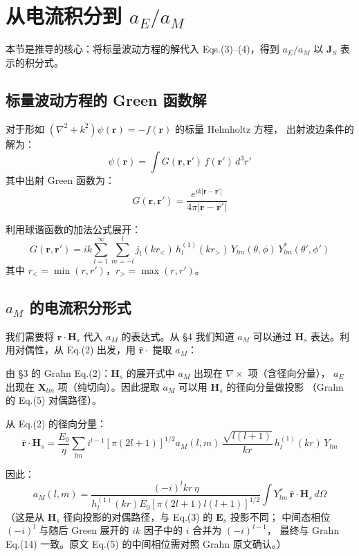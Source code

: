 \section{从电流积分到 $a_E/a_M$}

本节是推导的核心：将标量波动方程的解代入 Eqs.(3)--(4)，得到 $a_E/a_M$ 以 $\mathbf{J}_S$ 表示的积分式。

\subsection{标量波动方程的 Green 函数解}

对于形如 $(\nabla^2 + k^2)\psi(\mathbf{r}) = -f(\mathbf{r})$ 的标量 Helmholtz 方程，
出射波边条件的解为：
$$
\psi(\mathbf{r}) = \int G(\mathbf{r},\mathbf{r}')\,f(\mathbf{r}')\,d^3r'
$$
其中出射 Green 函数为：
$$
G(\mathbf{r},\mathbf{r}') = \frac{e^{ik|\mathbf{r}-\mathbf{r}'|}}{4\pi|\mathbf{r}-\mathbf{r}'|}
$$

利用球谐函数的加法公式展开：
$$
G(\mathbf{r},\mathbf{r}') = ik\sum_{l=1}^\infty\sum_{m=-l}^l j_l(kr_<)\,h_l^{(1)}(kr_>)\,
  Y_{lm}(\theta,\phi)\,Y_{lm}^*(\theta',\phi')
$$
其中 $r_< = \min(r,r')$，$r_> = \max(r,r')$。

\subsection{$a_M$ 的电流积分形式}

我们需要将 $\mathbf{r}\cdot\mathbf{H}_s$ 代入 $a_M$ 的表达式。从 \S4 我们知道 $a_M$ 可以通过
$\mathbf{H}_s$ 表达。利用对偶性，从 Eq.(2) 出发，用 $\hat{\mathbf{r}}\cdot$ 提取 $a_M$：

由 §3 的 Grahn Eq.(2)：$\mathbf{H}_s$ 的展开式中 $a_M$ 出现在 $\nabla\times$ 项（含径向分量），
$a_E$ 出现在 $\mathbf{X}_{lm}$ 项（纯切向）。因此提取 $a_M$ 可以用 $\mathbf{H}_s$ 的径向分量做投影
（Grahn 的 Eq.(5) 对偶路径）。

从 Eq.(2) 的径向分量：
$$
\hat{\mathbf{r}}\cdot\mathbf{H}_s = \frac{E_0}{\eta}\sum_{lm} i^{l-1}[\pi(2l+1)]^{1/2}
  a_M(l,m)\,\frac{\sqrt{l(l+1)}}{kr}\,h_l^{(1)}(kr)\,Y_{lm}
$$

因此：
$$
a_M(l,m) = \frac{(-i)^{l}kr\,\eta}{h_l^{(1)}(kr)E_0[\pi(2l+1)l(l+1)]^{1/2}}
  \int Y_{lm}^*\,\hat{\mathbf{r}}\cdot\mathbf{H}_s\,d\Omega
$$
（这是从 $\mathbf{H}_s$ 径向投影的对偶路径，与 Eq.(3) 的 $\mathbf{E}_s$ 投影不同；
中间态相位 $(-i)^l$ 与随后 Green 展开的 $ik$ 因子中的 $i$ 合并为 $(-i)^{l-1}$，
最终与 Grahn Eq.(14) 一致。原文 Eq.(5) 的中间相位需对照 Grahn 原文确认。）

